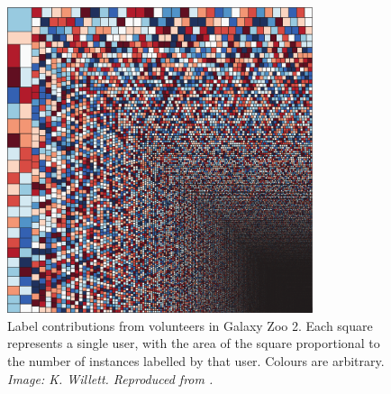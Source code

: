     \begin{figure}
        \centering
        \includegraphics[width=0.8\textwidth]{images/galaxyzoovolunteers}
        \caption{Label contributions from volunteers in Galaxy Zoo 2. Each
            square represents a single user, with the area of the square
            proportional to the number of instances labelled by that user.
            Colours are arbitrary.
            \emph{Image: K. Willett. Reproduced from \citet{marshall15}.}}
        \label{fig:galaxy-zoo-2-volunteer-distribution}
    \end{figure}
